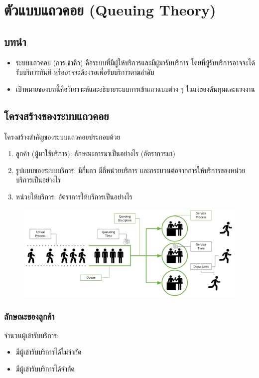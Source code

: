\chapter{ตัวแบบแถวคอย (Queuing Theory)}

\section{บทนำ}
\begin{itemize}
	\item ระบบแถวคอย (การเข้าคิว) คือระบบที่มีผู้ให้บริการและมีผู้มารับบริการ โดยที่ผู้รับบริการอาจจะได้รับบริการทันที หรืออาจจะต้องรอเพื่อรับบริการตามลำดับ
	\item เป้าหมายของบทนี้คือวิเคราะห์และอธิบายระบบการเข้าแถวแบบต่าง ๆ ในแง่ของต้นทุนและแรงงาน
\end{itemize}

\section{โครงสร้างของระบบแถวคอย}
โครงสร้างสำคัญของระบบแถวคอยประกอบด้วย
\begin{enumerate}
	\item ลูกค้า (ผู้มาใช้บริการ): ลักษณะการมาเป็นอย่างไร (อัตราการมา)
	\item รูปแบบของระบบบริการ: มีกี่แถว มีกี่หน่วยบริการ และกระบวนต่อจากการให้บริการของหน่วยบริการเป็นอย่างไร
	\item หน่วยให้บริการ: อัตราการให้บริการเป็นอย่างไร
\end{enumerate}
\begin{figure}[h]
	\centering
	\includegraphics[width=1\linewidth]{image/queue}
\end{figure}

\subsection{ลักษณะของลูกค้า}
จำนวนผู้เข้ารับบริการ:
\begin{itemize}
	\item มีผู้เข้ารับบริการได้ไม่จำกัด
	\item มีผู้เข้ารับบริการได้จำกัด
\end{itemize}

